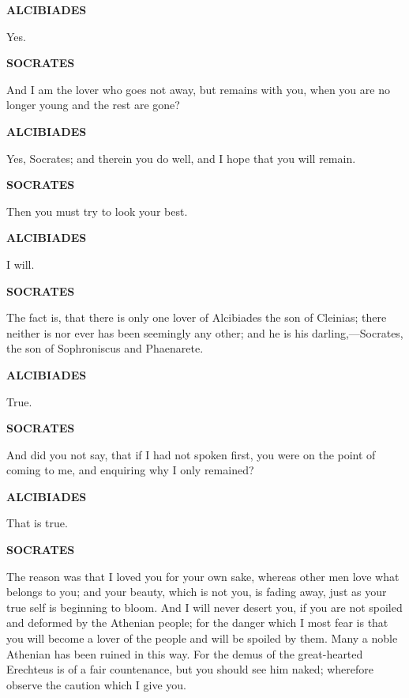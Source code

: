 \documentclass[11pt,letter]{article}
\begin{document}
\par \textbf{ALCIBIADES}
\par   Yes.

\par \textbf{SOCRATES}
\par   And I am the lover who goes not away, but remains with you, when you are no longer young and the rest are gone?

\par \textbf{ALCIBIADES}
\par   Yes, Socrates; and therein you do well, and I hope that you will remain.

\par \textbf{SOCRATES}
\par   Then you must try to look your best.

\par \textbf{ALCIBIADES}
\par   I will.

\par \textbf{SOCRATES}
\par   The fact is, that there is only one lover of Alcibiades the son of Cleinias; there neither is nor ever has been seemingly any other; and he is his darling,—Socrates, the son of Sophroniscus and Phaenarete.

\par \textbf{ALCIBIADES}
\par   True.

\par \textbf{SOCRATES}
\par   And did you not say, that if I had not spoken first, you were on the point of coming to me, and enquiring why I only remained?

\par \textbf{ALCIBIADES}
\par   That is true.

\par \textbf{SOCRATES}
\par   The reason was that I loved you for your own sake, whereas other men love what belongs to you; and your beauty, which is not you, is fading away, just as your true self is beginning to bloom. And I will never desert you, if you are not spoiled and deformed by the Athenian people; for the danger which I most fear is that you will become a lover of the people and will be spoiled by them. Many a noble Athenian has been ruined in this way. For the demus of the great-hearted Erechteus is of a fair countenance, but you should see him naked; wherefore observe the caution which I give you.
\end{document}
